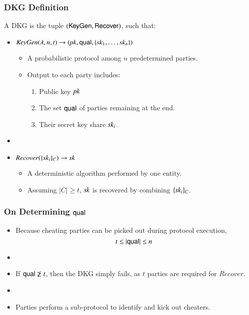 \documentclass[hyperref={pdfpagelabels=true},table,dvipsnames,14pt,aspectratio=169]{beamer}
\begin{document}
\begin{frame}
  \frametitle{DKG Definition}

  A DKG is the tuple $(\mathsf{KeyGen}, \mathsf{Recover})$, such that:

  \begin{itemize}
    \item<2-> $\mathit{KeyGen}(\lambda, n, t) \rightarrow ( \mathit{pk}, \mathsf{qual}, \{\mathit{sk}_1, \ldots, \mathit{sk}_n \} )$
    \begin{itemize}
      \item<3-> A probabilistic protocol among $n$ predetermined parties.
      \item<4-> Output to each party includes:
    \begin{enumerate}
      \item<5->[1.] Public key $\mathit{pk}$
      \item<6->[2.] The set $\mathsf{qual}$ of parties remaining at the end.
      \item<7->[3.] Their secret key share $\mathit{sk}_i$.
    \end{enumerate}

    \end{itemize}
    \item[]
    \item<8-> $\mathit{Recover}(\{ \mathit{sk}_i \}_C) \rightarrow \mathit{sk}$
    \begin{itemize}
      \item<9-> A deterministic algorithm performed by one entity.
      \item<10-> Assuming $\lvert C \rvert \geq t$, $\mathit{sk}$ is recovered by combining $\{ \mathit{sk}_i \}_C$.
    \end{itemize}
  \end{itemize}
\end{frame}

\begin{frame}
  \frametitle{On Determining $\mathsf{qual}$}

  \begin{itemize}
    \item<1-> Because cheating parties can be picked out during protocol execution,
      \[ t \leq \lvert \mathsf{qual} \rvert \leq n \]
    \item[]
    \item<2-> If $\mathsf{qual} \not\geq t$, then the DKG simply fails, as $t$ parties are required for $\mathit{Recover}$.
    \item[]
    \item<3-> Parties perform a sub-protocol to identify and kick out cheaters.
  \end{itemize}
\end{frame}
\end{document}
